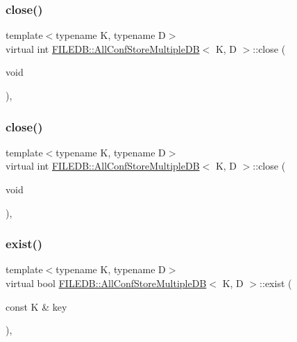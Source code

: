 \subsubsection{\texorpdfstring{close()}{close()}\hspace{0.1cm}{\footnotesize\ttfamily [2/3]}}
{\footnotesize\ttfamily template$<$typename K, typename D$>$ \\
virtual int \mbox{\hyperlink{classFILEDB_1_1AllConfStoreMultipleDB}{F\+I\+L\+E\+D\+B\+::\+All\+Conf\+Store\+Multiple\+DB}}$<$ K, D $>$\+::close (\begin{DoxyParamCaption}\item[{void}]{ }\end{DoxyParamCaption})\hspace{0.3cm}{\ttfamily [inline]}, {\ttfamily [virtual]}}

\mbox{\label{classFILEDB_1_1AllConfStoreMultipleDB_a71aed1deeb31450afee4b692941dbae1}} 
\subsubsection{\texorpdfstring{close()}{close()}\hspace{0.1cm}{\footnotesize\ttfamily [3/3]}}
{\footnotesize\ttfamily template$<$typename K, typename D$>$ \\
virtual int \mbox{\hyperlink{classFILEDB_1_1AllConfStoreMultipleDB}{F\+I\+L\+E\+D\+B\+::\+All\+Conf\+Store\+Multiple\+DB}}$<$ K, D $>$\+::close (\begin{DoxyParamCaption}\item[{void}]{ }\end{DoxyParamCaption})\hspace{0.3cm}{\ttfamily [inline]}, {\ttfamily [virtual]}}

\mbox{\label{classFILEDB_1_1AllConfStoreMultipleDB_a5c9333af45c37c53c863ad2a07a9843b}} 
\subsubsection{\texorpdfstring{exist()}{exist()}\hspace{0.1cm}{\footnotesize\ttfamily [1/3]}}
{\footnotesize\ttfamily template$<$typename K, typename D$>$ \\
virtual bool \mbox{\hyperlink{classFILEDB_1_1AllConfStoreMultipleDB}{F\+I\+L\+E\+D\+B\+::\+All\+Conf\+Store\+Multiple\+DB}}$<$ K, D $>$\+::exist (\begin{DoxyParamCaption}\item[{const K \&}]{key }\end{DoxyParamCaption})\hspace{0.3cm}{\ttfamily [inline]}, {\ttfamily [virtual]}}

